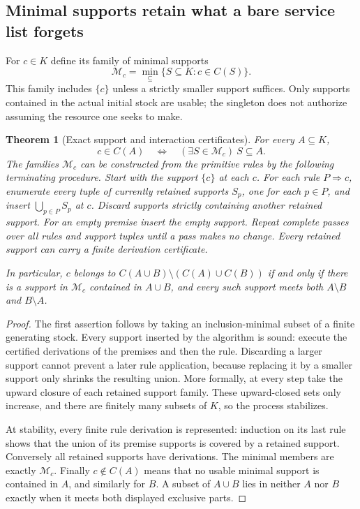 \documentclass[11pt]{article}
\newtheorem{theorem}{Theorem}[section]
\theoremstyle{definition}
\theoremstyle{remark}
\begin{document}
\subsection{Minimal supports retain what a bare service list forgets}

For $c\in K$ define its family of minimal supports
\[
 \mathcal M_c=\min_{\subseteq}\{S\subseteq K:c\in C(S)\}.
\]
This family includes $\{c\}$ unless a strictly smaller support suffices.
Only supports contained in the actual initial stock are usable; the
singleton does not authorize assuming the resource one seeks to make.

\begin{theorem}[Exact support and interaction certificates]
\label{syn-thm:support}
For every $A\subseteq K$,
\[
            c\in C(A)\quad\Longleftrightarrow\quad
            (\exists S\in\mathcal M_c)\ S\subseteq A.
\]
The families $\mathcal M_c$ can be constructed from the primitive rules by
the following terminating procedure. Start with the support $\{c\}$ at
each $c$. For each rule $P\Rightarrow c$, enumerate every tuple of currently retained
supports $S_p$, one for each $p\in P$, and insert $\bigcup_{p\in P}S_p$
at $c$. Discard supports strictly containing another retained support.
For an empty premise insert the empty support. Repeat complete passes over
all rules and support tuples until a pass makes no change.
Every retained support can carry a finite derivation certificate.

In particular, $c$ belongs to
$C(A\cup B)\setminus(C(A)\cup C(B))$ if and only if there is a support
in $\mathcal M_c$ contained in $A\cup B$, and every such support meets
both $A\setminus B$ and $B\setminus A$.
\end{theorem}
\begin{proof}
The first assertion follows by taking an inclusion-minimal subset of a
finite generating stock. Every support inserted by the algorithm is sound:
execute the certified derivations of the premises and then the rule.
Discarding a larger support cannot prevent a later rule application,
because replacing it by a smaller support only shrinks the resulting
union. More formally, at every step take the upward closure of each
retained support family. These upward-closed sets only increase, and
there are finitely many subsets of $K$, so the process stabilizes.

At stability, every finite rule derivation is represented: induction on
its last rule shows that the union of its premise supports is covered by
a retained support. Conversely all retained supports have derivations.
The minimal members are exactly $\mathcal M_c$. Finally $c\notin C(A)$
means that no usable minimal support is contained in $A$, and similarly
for $B$. A subset of $A\cup B$ lies in neither $A$ nor $B$ exactly when
it meets both displayed exclusive parts.
\end{proof}
\end{document}
